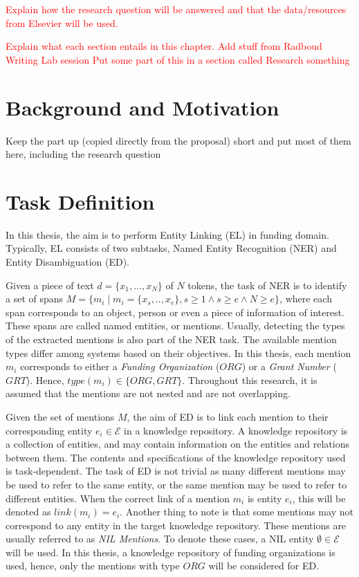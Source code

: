 \documentclass{report}
\theoremstyle{definition}
\theoremstyle{remark}
\begin{document}
\textcolor{red}{Explain how the research question will be answered and that the data/resources from Elsevier will be used.}

\textcolor{red}{Explain what each section entails in this chapter.}
\textcolor{red}{Add stuff from Radboud Writing Lab session}
\textcolor{red}{Put some part of this in a section called Research something}
\newpage
\section{Background and Motivation}
Keep the part up (copied directly from the proposal) short and put most of them here, including the research question

\newpage
\section{Task Definition}
In this thesis, the aim is to perform Entity Linking (EL) in funding domain. Typically, EL consists of two subtasks, Named Entity Recognition (NER) and Entity Disambiguation (ED).

Given a piece of text $d=\{x_1,...,x_N\}$ of $N$ tokens, the task of NER is to identify a set of spans $M = \{m_i \mid m_i = \{x_s,..,x_e\}, s \geq 1 \land s\geq e \land N \geq e\}$, where each span corresponds to an object, person or even a piece of information of interest. These spans are called named entities, or mentions. Usually, detecting the types of the extracted mentions is also part of the NER task. The available mention types differ among systems based on their objectives. In this thesis, each mention $m_i$ corresponds to either a \textit{Funding Organization} ($ORG$)  or a \textit{Grant Number} ($GRT$). Hence, $type(m_i) \in \{ORG,GRT\}$. Throughout this research, it is assumed that the mentions are not nested and are not overlapping.

Given the set of mentions $M$, the aim of ED is to link each mention to their corresponding entity $e_i \in \mathcal{E} $ in a knowledge repository. A knowledge repository is a collection of entities, and may contain information on the entities and relations between them. The contents and specifications of the knowledge repository used is task-dependent. The task of ED is not trivial as many different mentions may be used to refer to the same entity, or the same mention may be used to refer to different entities. When the correct link of a mention $m_i$ is entity $e_i$, this will be denoted as $link(m_i) = e_i $.  Another thing to note is that some mentions may not correspond to any entity in the target knowledge repository. These mentions are usually referred to as \textit{NIL Mentions}. To denote these cases, a NIL entity $\emptyset \in \mathcal{E}$ will be used. In this thesis, a knowledge repository of funding organizations is used, hence, only the mentions with type $ORG$ will be considered for ED.
\end{document}
